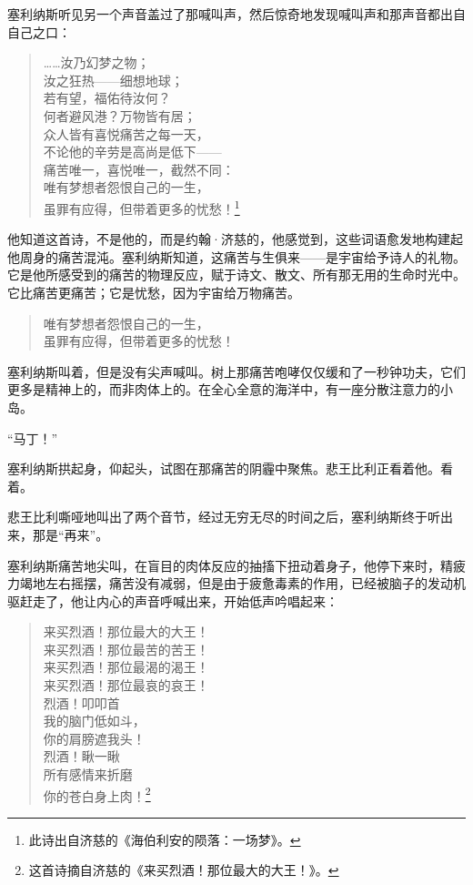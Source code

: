 \documentclass[AutoFakeBold=true]{book}
\begin{document}
塞利纳斯听见另一个声音盖过了那喊叫声，然后惊奇地发现喊叫声和那声音都出自自己之口：

\begin{quote}
	{\kaishu ……汝乃幻梦之物；\\
	汝之狂热——细想地球；\\
	若有望，福佑待汝何？\\
	何者避风港？万物皆有居；\\
	众人皆有喜悦痛苦之每一天，\\
	不论他的辛劳是高尚是低下——\\
	痛苦唯一，喜悦唯一，截然不同：\\
	唯有梦想者怨恨自己的一生，\\
	虽罪有应得，但带着更多的忧愁！}\footnote{此诗出自济慈的《海伯利安的陨落：一场梦》。}
\end{quote}

他知道这首诗，不是他的，而是约翰·济慈的，他感觉到，这些词语愈发地构建起他周身的痛苦混沌。塞利纳斯知道，这痛苦与生俱来——是宇宙给予诗人的礼物。它是他所感受到的痛苦的物理反应，赋于诗文、散文、所有那无用的生命时光中。它比痛苦更痛苦；它是忧愁，因为宇宙给万物痛苦。

\begin{quote}
	{\kaishu 唯有梦想者怨恨自己的一生，\\
	虽罪有应得，但带着更多的忧愁！}
\end{quote}

塞利纳斯叫着，但是没有尖声喊叫。树上那痛苦咆哮仅仅缓和了一秒钟功夫，它们更多是精神上的，而非肉体上的。在全心全意的海洋中，有一座分散注意力的小岛。

``马丁！''

塞利纳斯拱起身，仰起头，试图在那痛苦的阴霾中聚焦。悲王比利正看着他。{\kaishu 看着。}

悲王比利嘶哑地叫出了两个音节，经过无穷无尽的时间之后，塞利纳斯终于听出来，那是``再来''。

塞利纳斯痛苦地尖叫，在盲目的肉体反应的抽搐下扭动着身子，他停下来时，精疲力竭地左右摇摆，痛苦没有减弱，但是由于疲惫毒素的作用，已经被脑子的发动机驱赶走了，他让内心的声音呼喊出来，开始低声吟唱起来：

\begin{quote}
	{\kaishu 来买烈酒！那位最大的大王！\\
	来买烈酒！那位最苦的苦王！\\
	来买烈酒！那位最渴的渴王！\\
	来买烈酒！那位最哀的哀王！\\
	烈酒！叩叩首\\
	我的脑门低如斗，\\
	你的肩膀遮我头！\\
	烈酒！瞅一瞅\\
	所有感情来折磨\\
	你的苍白身上肉！}\footnote{这首诗摘自济慈的《来买烈酒！那位最大的大王！》。}
\end{quote}
\end{document}
